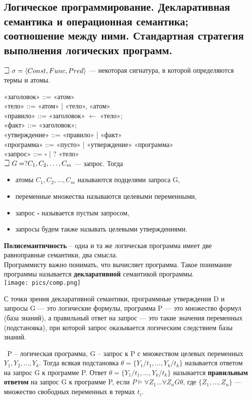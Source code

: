 \subsection{Логическое  программирование. Декларативная семантика и операционная семантика;  соотношение между ними.  Стандартная стратегия выполнения логических программ.}

$\mathLet ~ \sigma = \langle Const,Func,Pred\rangle$ — некоторая сигнатура, в которой определяются термы и атомы.

«заголовок» ::= «атом» \\
«тело» ::= «атом» | «тело», «атом» \\ 
«правило» ::= «заголовок» $\leftarrow$ «тело»; \\
«факт» ::= «заголовок»; \\ 
«утверждение» ::= «правило» | «факт» \\ 
«программа» ::= «пусто» | «утверждение» «программа» \\
«запрос» ::= $\square$ | ? «тело» \\

$\mathLet ~ G = ? C_{1},C_{2},\ldots,C_{m}$ — запрос. Тогда
\begin{itemize}
    \item атомы $C_{1},C_{2},\ldots,C_{m}$ называются подцелями запроса G,
    \item переменные множества называются целевыми переменными,
    \item запрос $\square$ называется пустым запросом,
    \item запросы будем также называть целевыми утверждениями.
\end{itemize}
 
\textbf{Полисемантичность} -- одна и та же логическая программа имеет две равноправные семантики, два смысла. \\
Программисту важно понимать, что вычисляет программа. Такое понимание программы называется \textbf{декларативной} семантикой программы. \\ 
\texttt{[image: pics/comp.png]}

С точки зрения декларативной семантики, программные утверждения D и запросы G — это логические формулы, программа P — это множество формул (база знаний), а правильный ответ на запрос — это такие значения переменных (подстановка), при которой запрос оказывается логическим следствием базы знаний.

\mathLet \ P -- логическая программа, G -- запрос к P с множеством целевых переменных $Y_{1},Y_{2},\ldots,Y_{k}$. Тогда всякая подстановка $\theta = \{Y_{1}/t_{1},\ldots,Y_{k}/t_{k}\}$ называется ответом на запрос G к программе P. Ответ $\theta = \{Y_{1}/t_{1},\ldots, Y_{k}/t_{k}\}$ называется \textbf{правильным ответом} на запрос G к программе P, если $P \models \forall Z_{1} \ldots \forall Z_{n}G\theta$, где $\{Z_{1},\ldots,Z_{n}\}$ --- множество свободных переменных в термах $t_i$.

